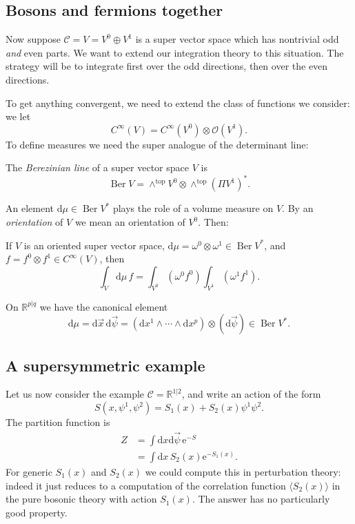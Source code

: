 \documentclass[12pt,letterpaper,reqno]{article}
\numberwithin{equation}{section}
\newcommand{\cC}{\ensuremath{\mathcal C}}
\newcommand{\cO}{\ensuremath{\mathcal O}}
\newcommand{\R}{\ensuremath{\mathbb R}}
\newcommand{\e}{{\mathrm e}}
\newcommand{\de}{\mathrm{d}}
\newcommand{\rmtop}{\mathrm{top}}
\newcommand{\IP}[1]{\langle#1\rangle}
\newcommand{\ti}[1]{\textit{#1}}
\DeclareMathOperator{\Ber}{Ber}
\begin{document}
\subsection{Bosons and fermions together}

Now suppose $\cC = V = V^0 \oplus V^1$ is a super vector space 
which has nontrivial odd \ti{and} even parts. We want to extend
our integration theory to this situation. The strategy will be to 
integrate first over the odd directions, then over 
the even directions.

To get anything convergent,
we need to extend the class of functions we consider:
we let
\begin{equation}
  C^\infty(V) = C^\infty(V^0) \otimes \cO(V^1).
\end{equation}
To define measures we need 
the super analogue of the determinant line:
\begin{defn}
The \ti{Berezinian line} of a super vector space $V$ is
\begin{equation}
  \Ber V = \wedge^\rmtop V^0 \otimes \wedge^\rmtop (\Pi V^1)^*.
\end{equation}
\end{defn}
An element $\de \mu \in \Ber V^*$ plays the role of a volume measure
on $V$. By an \ti{orientation} of $V$ we mean an orientation of $V^0$.
Then:
\begin{defn} If $V$ is an oriented 
super vector space, $\de \mu = \omega^0 \otimes \omega^1 \in \Ber V^*$,
and $f = f^0 \otimes f^1 \in C^\infty(V)$, then
\begin{equation}
    \int_V \de \mu \, f = \int_{V^0} \left( \omega^0 f^0 \right) \int_{V^1} \left( \omega^1 f^1 \right).
\end{equation}
\end{defn}
On $\R^{p \vert q}$ we have the canonical element
\begin{equation}
  \de \mu = \de \vec{x} \, \de \vec{\psi} = (\de x^1 \wedge \cdots \wedge \de x^p) \otimes (\de \vec\psi) \in \Ber V^*.
\end{equation}


\subsection{A supersymmetric example}

Let us now consider the example $\cC = \R^{1 \vert 2}$, and write an action
of the form
\begin{equation} \label{eq:r21-action-generic}
  S(x, \psi^1, \psi^2) = S_1(x) + S_2(x) \psi^1 \psi^2.
\end{equation}
The partition function is
\begin{align}
  Z &= \int \de x \de \vec\psi \, \e^{-S} \\
  &= \int \de x \, S_2(x) \e^{-S_1(x)}.
\end{align}
For generic $S_1(x)$ and $S_2(x)$
we could compute this in perturbation theory:
indeed it just reduces to a computation of the correlation
function $\IP{S_2(x)}$ in 
the pure bosonic theory with action $S_1(x)$.
The answer has no particularly good property.
\end{document}
